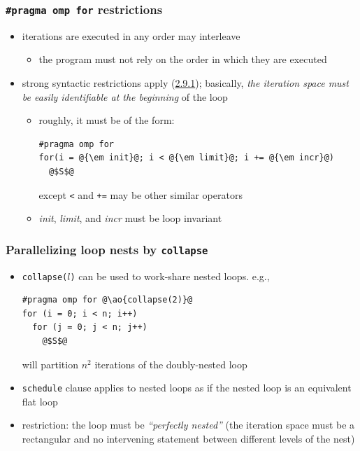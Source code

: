 \documentclass[12pt,dvipdfmx]{beamer}
\newcommand{\sectionompforform}{{\href{https://www.openmp.org/spec-html/5.0/openmpsu40.html\#x63-1260002.9.1}{2.9.1}}}
\newcommand{\ao}[1]{{\color{blue}#1}}
\begin{document}
\begin{frame}[fragile]
\frametitle{{\tt \#pragma omp for} restrictions}
\begin{itemize}
\item iterations are executed in any order may interleave
  \begin{itemize}
  \item the program must not rely on the order in which they are executed
  \end{itemize}
\item strong syntactic restrictions apply (\sectionompforform); basically,
\ao{\em the iteration space must be easily 
  identifiable at the beginning\/} of the loop
\begin{itemize}
\item roughly, it must be of the form:
\begin{lstlisting}
#pragma omp for
for(i = @{\em init}@; i < @{\em limit}@; i += @{\em incr}@) 
  @$S$@
\end{lstlisting}
except {\tt <} and {\tt +=} may be other similar operators
\item {\em init}, {\em limit}, and {\em incr} must be loop invariant
\end{itemize}
\end{itemize}
\end{frame}

\begin{frame}[fragile]
\frametitle{Parallelizing loop nests by \ao{\tt collapse}}
\begin{itemize}
\item \ao{\tt collapse($l$)} can be used to work-share nested loops. e.g.,
\begin{lstlisting}
#pragma omp for @\ao{collapse(2)}@
for (i = 0; i < n; i++)
  for (j = 0; j < n; j++)
    @$S$@
\end{lstlisting}
will partition $n^2$ iterations of the doubly-nested loop
\item {\tt schedule} clause applies to nested loops as if 
  the nested loop is an equivalent flat loop
\item restriction: the loop must be \ao{\em ``perfectly nested''}
  (the iteration space must be a rectangular and no intervening
  statement between different levels of the nest)
\end{itemize}
\end{frame}
\end{document}
